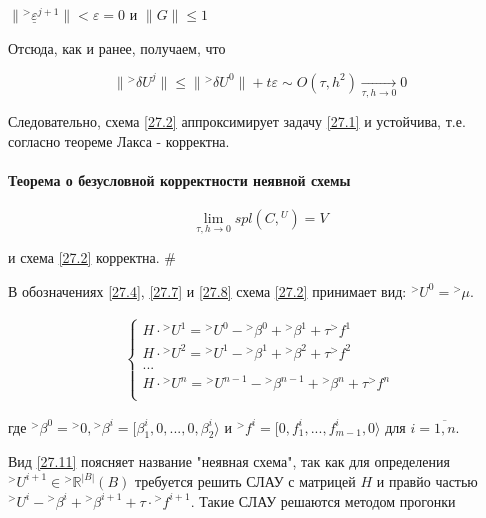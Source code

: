 \documentclass[__main__.tex]{subfiles}
\begin{document}
$\| {}^> \underline{\varepsilon}^{j+1} \| < \varepsilon = 0$ и $\| G \| \leq 1$

Отсюда, как и ранее, получаем, что 

$$
\| {}^> \delta U^j \| \leq \| {}^> \delta U^0 \| + t \varepsilon \sim O \left( \tau, h^2\right) \xrightarrow[\tau, h \rightarrow 0]{} 0
$$

Следовательно, схема \ref{27.2} аппроксимирует задачу \ref{27.1} и устойчива, т.е. согласно теореме Лакса - корректна.

\paragraph{Теорема о безусловной корректности неявной схемы}
	$$
	\lim_{\tau, h \rightarrow 0} spl \left( C, {}^U \right) = V
	$$
	
	и схема \ref{27.2} корректна. $\#$

В обозначениях \ref{27.4}, \ref{27.7} и \ref{27.8} схема \ref{27.2} принимает вид: ${}^> U^0 = {}^> \mu$.

\begin{gather}\label{27.11}
\begin{cases}
H \cdot {}^> U^1 = {}^> U^0 - {}^> \beta^0 + {}^>\beta^1 + \tau {}^> f^1 \\
H \cdot {}^> U^2 = {}^> U^1 - {}^> \beta^1 + {}^>\beta^2 + \tau {}^> f^2 \\
... \\
H \cdot {}^> U^n = {}^> U^{n-1} - {}^> \beta^{n-1} + {}^>\beta^n + \tau {}^> f^n \\
\end{cases}
\end{gather}

где ${}^> \beta^0 = {}^> 0, {}^> \beta^i = [ \beta^i_1, 0 , ...,  0, \beta^i_2 \rangle$ и ${}^>f^i = [ 0, f^i_1, ..., f^i_{m-1}, 0 \rangle$ для $i = \overline{1,n}$.

Вид \ref{27.11} поясняет название "неявная схема", так как для определения ${}^>U^{i+1} \in {}^> \mathbb{R}^{\left|B\right|} \left(B\right)$ требуется решить СЛАУ с матрицей $H$ и правйо частью ${}^>U^i - {}^>\beta^i + {}^> \beta^{i+1} + \tau \cdot {}^> f^{i+1}$. Такие СЛАУ решаются методом прогонки
\end{document}
